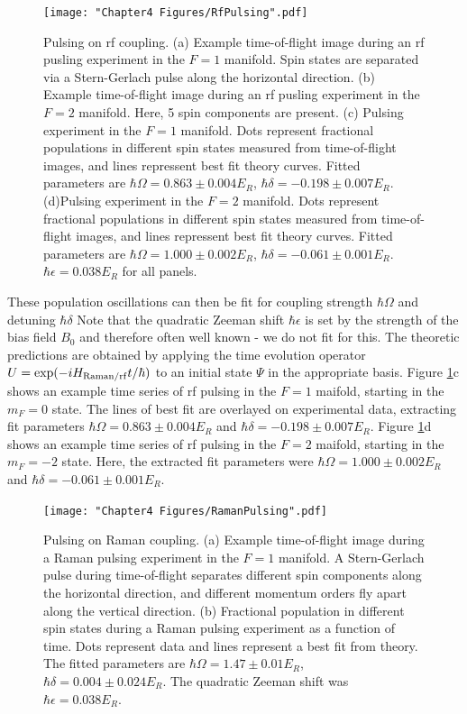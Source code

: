 \begin{figure}
	\texttt{[image: "Chapter4 Figures/RfPulsing".pdf]}
\caption[Pulsing on rf coupling]{Pulsing on rf coupling. (a) Example time-of-flight image during an rf pusling experiment in the $F=1$ manifold. Spin states are separated via a Stern-Gerlach pulse along the horizontal direction. (b) Example time-of-flight image during an rf pusling experiment in the $F=2$ manifold. Here, 5 spin components are present.  (c) Pulsing experiment in the $F=1$ manifold. Dots represent fractional populations in different spin states measured from time-of-flight images, and lines repressent best fit theory curves.  Fitted parameters are $\hbar\Omega=0.863\pm0.004 E_R$, $\hbar\delta=-0.198\pm0.007 E_R$. (d)Pulsing experiment in the $F=2$ manifold. Dots represent fractional populations in different spin states measured from time-of-flight images, and lines repressent best fit theory curves. Fitted parameters are $\hbar\Omega=1.000\pm0.002 E_R$, $\hbar\delta = -0.061\pm0.001 E_R$. $\hbar\epsilon=0.038 E_R$ for all panels.}
\label{fig:RfPulsing}
\end{figure}

These population oscillations can then be fit for coupling strength $\hbar\Omega$ and detuning $\hbar\delta$ Note that the quadratic Zeeman shift $\hbar\epsilon$ is set by the strength of the bias field $B_0$ and therefore often well known - we do not fit for this. The theoretic predictions are obtained by applying the time evolution operator $U={\rm exp}(-i H_{\rm Raman/rf} t/\hbar)$ to an initial state $\Psi$ in the appropriate basis. Figure \ref{fig:RfPulsing}c shows an example time series of rf pulsing in the $F=1$ maifold, starting in the $m_F=0$ state. The lines of best fit are overlayed on experimental data, extracting fit parameters $\hbar\Omega=0.863\pm0.004 E_R$ and $\hbar\delta=-0.198\pm0.007 E_R$. Figure \ref{fig:RfPulsing}d shows an example time series of rf pulsing in the $F=2$ maifold, starting in the $m_F=-2$ state. Here, the extracted fit parameters were $\hbar\Omega=1.000\pm0.002 E_R$ and $\hbar\delta = -0.061\pm0.001 E_R$.

\begin{figure}
	\texttt{[image: "Chapter4 Figures/RamanPulsing".pdf]}
\caption[Pulsing on Raman coupling]{Pulsing on Raman coupling. (a) Example time-of-flight image during a Raman pulsing experiment in the $F=1$ manifold. A Stern-Gerlach pulse during time-of-flight separates different spin components along the horizontal direction, and different momentum orders fly apart along the vertical direction. (b) Fractional population in different spin states during a Raman pulsing experiment as a function of time. Dots represent data and lines represent a best fit from theory. The fitted parameters are $\hbar\Omega=1.47\pm0.01 E_R$, $\hbar\delta = 0.004\pm0.024 E_R$. The quadratic Zeeman shift was $\hbar\epsilon=0.038 E_R$. }
\label{fig:RamanPulsing}
\end{figure}

